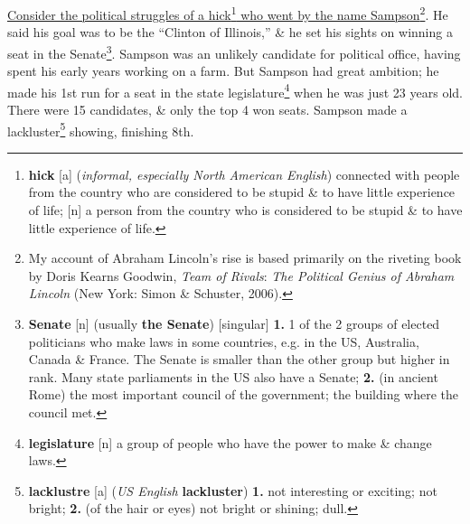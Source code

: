 \documentclass[oneside]{book}
\numberwithin{equation}{section}
\begin{document}
\underline{Consider the political struggles of a hick\footnote{\textbf{hick} [a] (\textit{informal, especially North American English}) connected with people from the country who are considered to be stupid \& to have little experience of life; [n] a person from the country who is considered to be stupid \& to have little experience of life.} who went by the name Sampson}\footnote{My account of Abraham Lincoln's rise is based primarily on the riveting book by Doris Kearns Goodwin, \textit{Team of Rivals}: \textit{The Political Genius of Abraham Lincoln} (New York: Simon \& Schuster, 2006).}. He said his goal was to be the ``Clinton of Illinois,'' \& he set his sights on winning a seat in the Senate\footnote{\textbf{Senate} [n] (usually \textbf{the Senate}) [singular] \textbf{1.} 1 of the 2 groups of elected politicians who make laws in some countries, e.g. in the US, Australia, Canada \& France. The Senate is smaller than the other group but higher in rank. Many state parliaments in the US also have a Senate; \textbf{2.} (in ancient Rome) the most important council of the government; the building where the council met.}. Sampson was an unlikely candidate for political office, having spent his early years working on a farm. But Sampson had great ambition; he made his 1st run for a seat in the state legislature\footnote{\textbf{legislature} [n] a group of people who have the power to make \& change laws.} when he was just 23 years old. There were 15 candidates, \& only the top 4 won seats. Sampson made a lackluster\footnote{\textbf{lacklustre} [a] (\textit{US English} \textbf{lackluster}) \textbf{1.} not interesting or exciting; not bright; \textbf{2.} (of the hair or eyes) not bright or shining; dull.} showing, finishing 8th.
\end{document}
